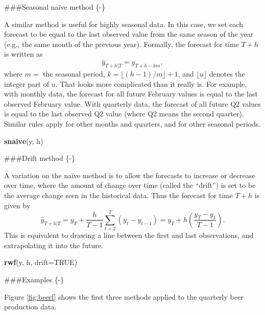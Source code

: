 \documentclass[]{book}
\newenvironment{Shaded}{\begin{snugshade}}{\end{snugshade}}
\newcommand{\DataTypeTok}[1]{\textcolor[rgb]{0.13,0.29,0.53}{#1}}
\newcommand{\KeywordTok}[1]{\textcolor[rgb]{0.13,0.29,0.53}{\textbf{#1}}}
\newcommand{\NormalTok}[1]{#1}
\newcommand{\OtherTok}[1]{\textcolor[rgb]{0.56,0.35,0.01}{#1}}
\begin{document}
\#\#\#Seasonal naïve method \{-\}

A similar method is useful for highly seasonal data. In this case, we set each forecast to be equal to the last observed value from the same season of the year (e.g., the same month of the previous year). Formally, the forecast for time \(T+h\) is written as
\[
   \hat{y}_{T+h|T} = y_{T+h-km},
\]
where \(m=\) the seasonal period, \(k=\lfloor (h-1)/m\rfloor+1\), and \(\lfloor u \rfloor\) denotes the integer part of \(u\). That looks more complicated than it really is. For example, with monthly data, the forecast for all future February values is equal to the last observed February value. With quarterly data, the forecast of all future Q2 values is equal to the last observed Q2 value (where Q2 means the second quarter). Similar rules apply for other months and quarters, and for other seasonal periods.

\begin{Shaded}
\begin{Highlighting}[]
\KeywordTok{snaive}\NormalTok{(y, h)}
\end{Highlighting}
\end{Shaded}

\#\#\#Drift method \{-\}

A variation on the naïve method is to allow the forecasts to increase or decrease over time, where the amount of change over time (called the ``drift'') is set to be the average change seen in the historical data. Thus the forecast for time \(T+h\) is given by
\[
  \hat{y}_{T+h|T} = y_{T} + \frac{h}{T-1}\sum_{t=2}^T (y_{t}-y_{t-1}) = y_{T} + h \left( \frac{y_{T} -y_{1}}{T-1}\right).
\]
This is equivalent to drawing a line between the first and last observations, and extrapolating it into the future.

\begin{Shaded}
\begin{Highlighting}[]
\KeywordTok{rwf}\NormalTok{(y, h, }\DataTypeTok{drift=}\OtherTok{TRUE}\NormalTok{)}
\end{Highlighting}
\end{Shaded}

\#\#\#Examples \{-\}

Figure \ref{fig:beerf} shows the first three methods applied to the quarterly beer production data.
\end{document}
